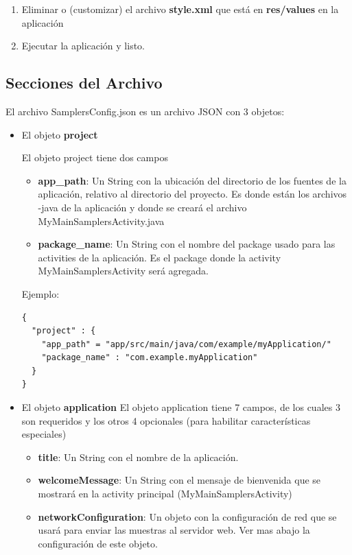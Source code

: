\begin{enumerate}
	\item Eliminar o (customizar) el archivo \textbf{style.xml} que está en \textbf{res/values} en la aplicación
	
	\item Ejecutar la aplicación y listo.

\end{enumerate}


\subsection{Secciones del Archivo}

El archivo SamplersConfig.json es un archivo JSON con 3 objetos:
\begin{itemize}
	\item El objeto \textbf{project}
		
	El objeto project tiene dos campos
	\begin{itemize}
		\item \textbf{app\_path}: Un String con la ubicación del directorio de los fuentes de la aplicación, relativo al directorio del proyecto. Es donde están los archivos -java de la aplicación y donde se creará el archivo MyMainSamplersActivity.java
		\item \textbf{package\_name}: Un String con el nombre del package usado para las activities de la aplicación. Es el package donde la activity MyMainSamplersActivity será agregada.
	\end{itemize}
	
Ejemplo:
\begin{lstlisting}[language=XML, frame=tlb]	
{
  "project" : {
    "app_path" = "app/src/main/java/com/example/myApplication/"
    "package_name" : "com.example.myApplication"
  }
}
\end{lstlisting}	
	
	\item El objeto \textbf{application}
	El objeto application tiene 7 campos, de los cuales 3 son requeridos y los otros 4 opcionales (para habilitar características especiales)
	\begin{itemize}
		\item \textbf{title}: Un String con el nombre de la aplicación.
		
		 \item \textbf{welcomeMessage}: Un String con el mensaje de bienvenida que se mostrará en la activity principal (MyMainSamplersActivity)
		 
		 \item \textbf{networkConfiguration}: Un objeto con la configuración de red que se usará para enviar las muestras al servidor web. Ver mas abajo la configuración de este objeto.
		 

\end{itemize}
\end{itemize}
